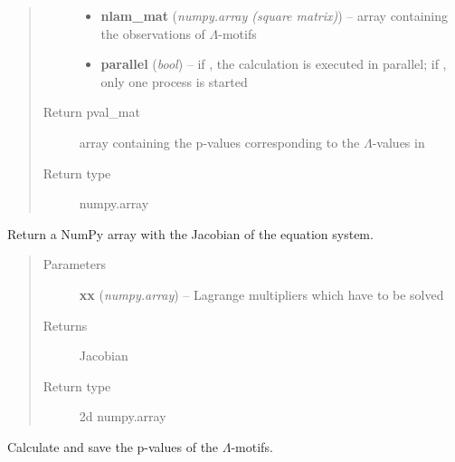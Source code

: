 \documentclass[letterpaper,10pt,english]{sphinxmanual}
\begin{document}
\begin{fulllineitems}
\begin{fulllineitems}
\begin{quote}
\begin{description}
\begin{itemize}
\item {} 
\textbf{nlam\_mat} (\emph{numpy.array (square matrix)}) -- array containing the observations of
\(\Lambda\)-motifs

\item {} 
\textbf{parallel} (\emph{bool}) -- if , the calculation is executed in parallel;
if , only one process is started

\end{itemize}

\item[{Return pval\_mat}] \leavevmode
array containing the p-values corresponding to the
\(\Lambda\)-values in 

\item[{Return type}] \leavevmode
numpy.array

\end{description}\end{quote}

\end{fulllineitems}


\begin{fulllineitems}
\label{source/src:src.bicm.BiCM.jacobian}
Return a NumPy array with the Jacobian of the equation system.
\begin{quote}\begin{description}
\item[{Parameters}] \leavevmode
\textbf{xx} (\emph{numpy.array}) -- Lagrange multipliers which have to be solved

\item[{Returns}] \leavevmode
Jacobian

\item[{Return type}] \leavevmode
2d numpy.array

\end{description}\end{quote}

\end{fulllineitems}


\begin{fulllineitems}
\label{source/src:src.bicm.BiCM.lambda_motifs}
Calculate and save the p-values of the \(\Lambda\)-motifs.


\end{fulllineitems}
\end{fulllineitems}
\end{document}
